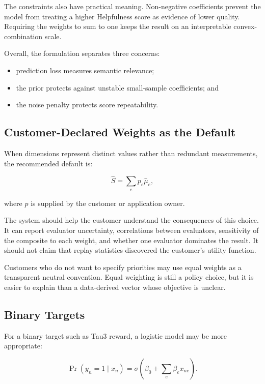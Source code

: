 \documentclass[11pt]{article}
\begin{document}
The constraints also have practical meaning. Non-negative coefficients prevent
the model from treating a higher Helpfulness score as evidence of lower
quality. Requiring the weights to sum to one keeps the result on an
interpretable convex-combination scale.

Overall, the formulation separates three concerns:

\begin{itemize}
    \item prediction loss measures semantic relevance;
    \item the prior protects against unstable small-sample coefficients; and
    \item the noise penalty protects score repeatability.
\end{itemize}

\subsection{Customer-Declared Weights as the Default}

When dimensions represent distinct values rather than redundant measurements,
the recommended default is:

\begin{equation}
\widehat{S}
=
\sum_e p_e \widehat{\mu}_e,
\end{equation}

where \(p\) is supplied by the customer or application owner.

The system should help the customer understand the consequences of this
choice. It can report evaluator uncertainty, correlations between evaluators,
sensitivity of the composite to each weight, and whether one evaluator
dominates the result. It should not claim that replay statistics discovered
the customer's utility function.

Customers who do not want to specify priorities may use equal weights as a
transparent neutral convention. Equal weighting is still a policy choice, but
it is easier to explain than a data-derived vector whose objective is unclear.

\subsection{Binary Targets}

For a binary target such as Tau3 reward, a logistic model may be more
appropriate:

\begin{equation}
\Pr(y_n=1 \mid x_n)
=
\sigma
\left(
\beta_0 + \sum_e \beta_e x_{ne}
\right).
\end{equation}
\end{document}
